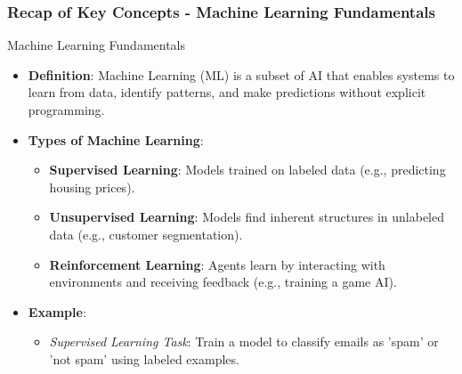 \documentclass[aspectratio=169]{beamer}
\begin{document}
\begin{frame}[fragile]
    \frametitle{Recap of Key Concepts - Machine Learning Fundamentals}
    \begin{block}{Machine Learning Fundamentals}
        \begin{itemize}
            \item \textbf{Definition}: Machine Learning (ML) is a subset of AI that enables systems to learn from data, identify patterns, and make predictions without explicit programming.
            \item \textbf{Types of Machine Learning}:
                \begin{itemize}
                    \item \textbf{Supervised Learning}: Models trained on labeled data (e.g., predicting housing prices).
                    \item \textbf{Unsupervised Learning}: Models find inherent structures in unlabeled data (e.g., customer segmentation).
                    \item \textbf{Reinforcement Learning}: Agents learn by interacting with environments and receiving feedback (e.g., training a game AI).
                \end{itemize}
            \item \textbf{Example}:
                \begin{itemize}
                    \item \textit{Supervised Learning Task}: Train a model to classify emails as 'spam' or 'not spam' using labeled examples.
                \end{itemize}
        \end{itemize}
    \end{block}
\end{frame}
\end{document}
